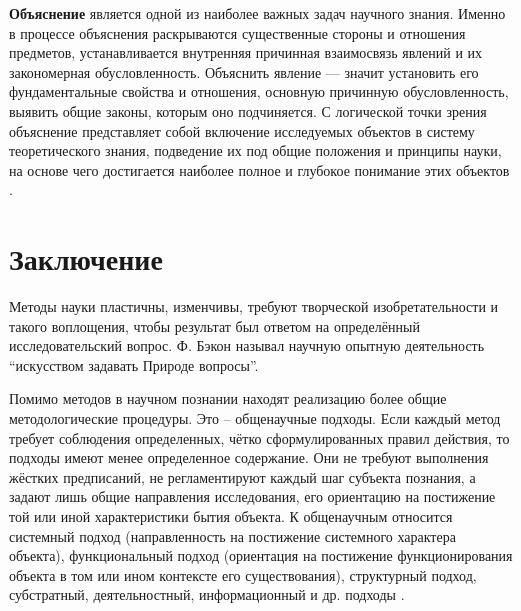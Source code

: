 \textbf{Объяснение} является одной из наиболее важных задач научного знания. Именно в процессе объяснения раскрываются существенные стороны и отношения предметов, устанавливается внутренняя причинная взаимосвязь явлений и их закономерная обусловленность. Объяснить явление — значит установить его фундаментальные свойства и отношения, основную причинную обусловленность, выявить общие законы, которым оно подчиняется. С логической точки зрения объяснение представляет собой включение исследуемых объектов в систему теоретического знания, подведение их под общие положения и принципы науки, на основе чего достигается наиболее полное и глубокое понимание этих объектов \cite{gtm:methods}.

\section*{Заключение}

Методы науки пластичны, изменчивы, требуют творческой изобретательности и такого воплощения, чтобы результат был ответом на определённый исследовательский вопрос. Ф. Бэкон называл научную опытную деятельность ``искусством задавать Природе вопросы''.

Помимо методов в научном познании находят реализацию более общие методологические процедуры. Это – общенаучные подходы. Если каждый метод требует соблюдения определенных, чётко сформулированных правил действия, то подходы имеют менее определенное содержание. Они не требуют выполнения жёстких предписаний, не регламентируют каждый шаг субъекта познания, а задают лишь общие направления исследования, его ориентацию на постижение той или иной характеристики бытия объекта. К общенаучным относится системный подход (направленность на постижение системного характера объекта), функциональный подход (ориентация на постижение функционирования объекта в том или ином контексте его существования), структурный подход, субстратный, деятельностный, информационный и др. подходы \cite{stud:methods}.


